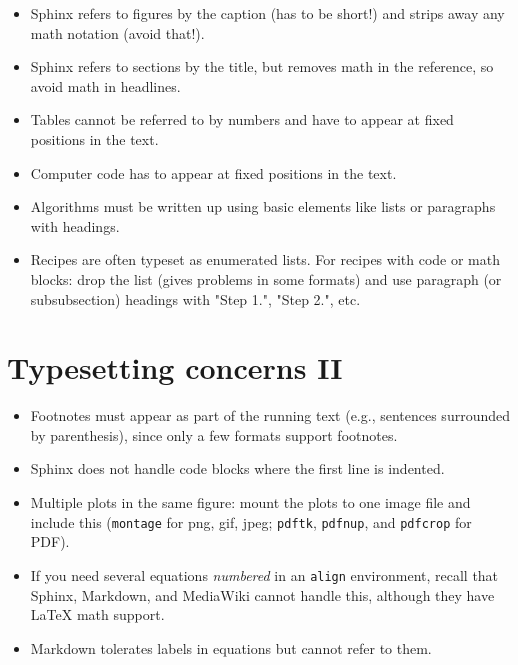 \documentclass[%
twoside,                 %
final,                   %
chapterprefix=true,      %
open=right               %
10pt]{book}
\begin{document}
\begin{itemize}
 \item Sphinx refers to figures by the caption (has to be short!) and
   strips away any math notation (avoid that!).

 \item Sphinx refers to sections by the title, but removes math in the
   reference, so avoid math in headlines.

 \item Tables cannot be referred to by numbers and have to appear at
   fixed positions in the text.

 \item Computer code has to appear at fixed positions in the text.

 \item Algorithms must be written up using basic elements like lists or
   paragraphs with headings.

 \item Recipes are often typeset as enumerated lists. For recipes with
   code or math blocks: drop the list (gives problems in some formats)
   and use paragraph (or subsubsection) headings with "Step 1.",
   "Step 2.", etc.
\end{itemize}

\noindent

\section*{Typesetting concerns II}

\begin{itemize}
 \item Footnotes must appear as part of the running text (e.g., sentences
   surrounded by parenthesis), since only a few formats support footnotes.

 \item Sphinx does not handle code blocks where the first line is indented.

 \item Multiple plots in the same figure: mount the plots to one image
   file and include this (\Verb!montage! for png, gif, jpeg; \Verb!pdftk!, \Verb!pdfnup!,
   and \Verb!pdfcrop! for PDF).

 \item If you need several equations \emph{numbered} in an \Verb!align! environment,
   recall that Sphinx, Markdown, and MediaWiki cannot handle this,
   although they have {\LaTeX} math support.

 \item Markdown tolerates labels in equations but cannot refer to them.
\end{itemize}
\end{document}
